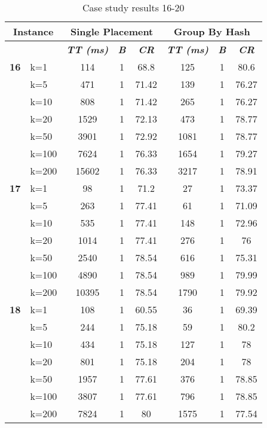     \begin{table}[htbp]
    \caption{Case study results 16-20}
    \centering
    \begin{tabular}{|l|l|c|c|c|c|c|c|}
    \hline
    \multicolumn{ 2}{|c|}{\textbf{Instance}} & \multicolumn{ 3}{c|}{\textbf{Single Placement}} & \multicolumn{ 3}{c|}{\textbf{Group By Hash}} \\ \hline
    \multicolumn{ 2}{|l|}{} & \textbf{\textit{TT (ms)}} & \textbf{\textit{B}} & \textbf{\textit{CR}} & \textbf{\textit{TT (ms)}} & \textbf{\textit{B}} & \textbf{\textit{CR}} \\ \hline
    \multicolumn{1}{|r|}{\textbf{16}} & k=1 & 114 & 1 & 68.8 & 125 & 1 & 80.6 \\ 
     & k=5 & 471 & 1 & 71.42 & 139 & 1 & 76.27 \\ 
     & k=10 & 808 & 1 & 71.42 & 265 & 1 & 76.27 \\ 
     & k=20 & 1529 & 1 & 72.13 & 473 & 1 & 78.77 \\ 
     & k=50 & 3901 & 1 & 72.92 & 1081 & 1 & 78.77 \\ 
     & k=100 & 7624 & 1 & 76.33 & 1654 & 1 & 79.27 \\ 
     & k=200 & 15602 & 1 & 76.33 & 3217 & 1 & 78.91 \\ \hline
    \multicolumn{1}{|r|}{\textbf{17}} & k=1 & 98 & 1 & 71.2 & 27 & 1 & 73.37 \\ 
     & k=5 & 263 & 1 & 77.41 & 61 & 1 & 71.09 \\ 
     & k=10 & 535 & 1 & 77.41 & 148 & 1 & 72.96 \\ 
     & k=20 & 1014 & 1 & 77.41 & 276 & 1 & 76 \\ 
     & k=50 & 2540 & 1 & 78.54 & 616 & 1 & 75.31 \\ 
     & k=100 & 4890 & 1 & 78.54 & 989 & 1 & 79.99 \\ 
     & k=200 & 10395 & 1 & 78.54 & 1790 & 1 & 79.92 \\ \hline
    \multicolumn{1}{|r|}{\textbf{18}} & k=1 & 108 & 1 & 60.55 & 36 & 1 & 69.39 \\ 
     & k=5 & 244 & 1 & 75.18 & 59 & 1 & 80.2 \\ 
     & k=10 & 434 & 1 & 75.18 & 127 & 1 & 78 \\ 
     & k=20 & 801 & 1 & 75.18 & 204 & 1 & 78 \\ 
     & k=50 & 1957 & 1 & 77.61 & 376 & 1 & 78.85 \\ 
     & k=100 & 3807 & 1 & 77.61 & 796 & 1 & 78.85 \\ 
     & k=200 & 7824 & 1 & 80 & 1575 & 1 & 77.54 \\ \hline

\end{tabular}
\end{table}
